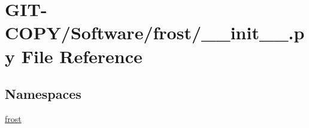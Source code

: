 \hypertarget{GIT-COPY_2Software_2frost_2____init_____8py}{}\section{G\+I\+T-\/\+C\+O\+P\+Y/\+Software/frost/\+\_\+\+\_\+init\+\_\+\+\_\+.py File Reference}
\label{GIT-COPY_2Software_2frost_2____init_____8py}
\subsection*{Namespaces}
\begin{DoxyCompactItemize}
\item 
 \hyperlink{namespacefrost}{frost}
\end{DoxyCompactItemize}

